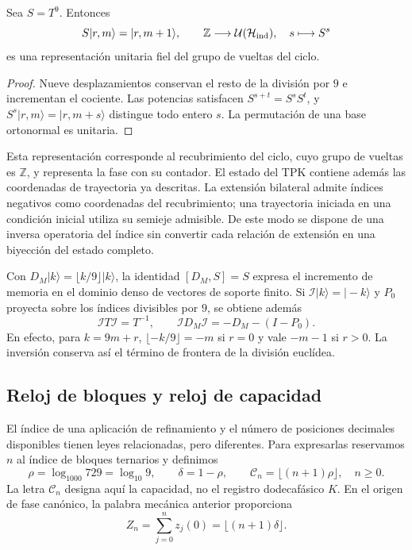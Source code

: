 \begin{proposition}
\label{mono-ampl:representacion}
Sea \(S=T^9\). Entonces
\[
 S|r,m\rangle=|r,m+1\rangle,\qquad
 \mathbb Z\longrightarrow\mathcal U(\mathcal H_{\rm ind}),
 \quad s\longmapsto S^s
\]
es una representación unitaria fiel del grupo de vueltas del ciclo.
\end{proposition}
\begin{proof}
Nueve desplazamientos conservan el resto de la división por \(9\) e
incrementan el cociente. Las potencias satisfacen
\(S^{s+t}=S^sS^t\), y \(S^s|r,m\rangle=|r,m+s\rangle\) distingue
todo entero \(s\). La permutación de una base ortonormal es unitaria.
\end{proof}

Esta representación corresponde al recubrimiento del ciclo, cuyo grupo
de vueltas es \(\mathbb Z\), y representa la fase con su contador. El
estado del TPK contiene además las coordenadas de trayectoria ya descritas.
La extensión bilateral admite índices negativos como coordenadas del
recubrimiento; una trayectoria iniciada en una condición inicial utiliza
su semieje admisible. De este modo se dispone de una inversa operatoria
del índice sin convertir cada relación de extensión en una biyección del
estado completo.

Con \(D_M|k\rangle=\lfloor k/9\rfloor|k\rangle\), la identidad
\([D_M,S]=S\) expresa el incremento de memoria en el dominio denso de
vectores de soporte finito. Si \(\mathcal I|k\rangle=|-k\rangle\) y
\(P_0\) proyecta sobre los índices divisibles por \(9\), se obtiene
además
\begin{equation}
 \mathcal I T\mathcal I=T^{-1},\qquad
 \mathcal I D_M\mathcal I=-D_M-(I-P_0).
 \label{mono-ampl:inversion-contador}
\end{equation}
En efecto, para \(k=9m+r\),
\(\lfloor-k/9\rfloor=-m\) si \(r=0\) y vale \(-m-1\) si \(r>0\).
La inversión conserva así el término de frontera de la división euclídea.

\subsection{Reloj de bloques y reloj de capacidad}
\label{mono-ampl:relojes}

El índice de una aplicación de refinamiento y el número de posiciones
decimales disponibles tienen leyes relacionadas, pero diferentes. Para
expresarlas reservamos \(n\) al índice de bloques ternarios y definimos
\[
 \rho=\log_{1000}729=\log_{10}9,\qquad
 \delta=1-\rho,\qquad
 \mathcal C_n=\lfloor(n+1)\rho\rfloor,\quad n\geq0.
\]
La letra \(\mathcal C_n\) designa aquí la capacidad, no el registro
dodecafásico \(K\). En el origen de fase canónico, la palabra mecánica
anterior proporciona
\[
 Z_n=\sum_{j=0}^{n}z_j(0)=\lfloor(n+1)\delta\rfloor.
\]

